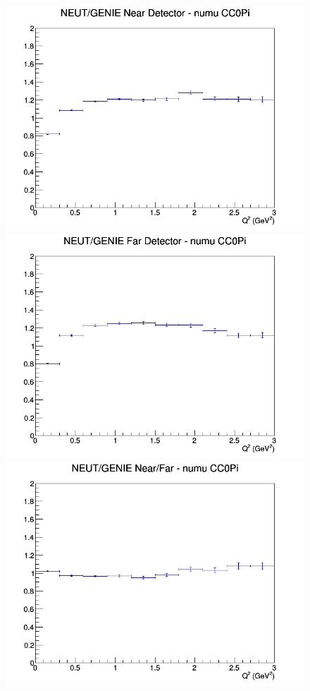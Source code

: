 \begin{figure}[h]
\endminipage
\newline
{}
\includegraphics[width=\linewidth]{eff_Q2/GAr/ratios/CC0Pi_NEUT_GENIE_numu_near_Q2.png}
\endminipage
{}
\includegraphics[width=\linewidth]{eff_Q2/GAr/ratios/CC0Pi_NEUT_GENIE_numu_far_Q2.png}
\endminipage
{}
\includegraphics[width=\linewidth]{eff_Q2/GAr/ratios/CC0Pi_NEUT_GENIE_numu_NF_Q2.png}

\end{figure}
